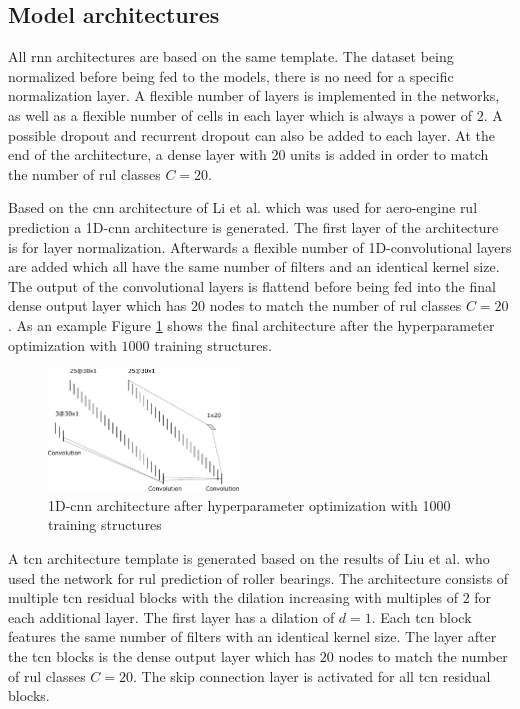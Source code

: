 \documentclass[conference]{IEEEtran}
\begin{document}
\subsection{Model architectures}
\label{sec:model_architectures}

All \gls{rnn} architectures are based on the same template. The dataset being normalized before being fed to the models, there is no need for a specific normalization layer. A flexible number of layers is implemented in the networks, as well as a flexible number of cells in each layer which is always a power of $ 2 $. A possible dropout and recurrent dropout can also be added to each layer. At the end of the architecture, a dense layer with $ 20 $ units is added in order to match the number of \gls{rul} classes $ C = 20 $.  

Based on the \gls{cnn} architecture of Li et al. \cite{Li2018} which was used for aero-engine \gls{rul} prediction a 1D-\gls{cnn} architecture is generated. The first layer of the architecture is for layer normalization. Afterwards a flexible number of 1D-convolutional layers are added which all have the same number of filters and an identical kernel size. The output of the convolutional layers is flattend before being fed into the final dense output layer which has $ 20 $ nodes to match the number of \gls{rul} classes $ C = 20 $. As an example Figure \ref{fig:cnn_architecture_1000_structures} shows the final architecture after the hyperparameter optimization with $ 1000 $ training structures.

\begin{figure}[htp]
	\centering
	\includegraphics[width=0.45\textwidth]{cnn_architecture_1000_structures.pdf}
	\caption{1D-\gls{cnn} architecture after hyperparameter optimization with 1000 training structures}
	\label{fig:cnn_architecture_1000_structures}
\end{figure}

A \gls{tcn} architecture template is generated based on the results of Liu et al. \cite{Liu2019} who used the network for \gls{rul} prediction of roller bearings. The architecture consists of multiple \gls{tcn} residual blocks with the dilation increasing with multiples of $ 2 $ for each additional layer. The first layer has a dilation of $ d = 1 $. Each \gls{tcn} block features the same number of filters with an identical kernel size. The layer after the \gls{tcn} blocks is the dense output layer which has $ 20 $ nodes to match the number of \gls{rul} classes $ C = 20 $. The skip connection layer is activated for all \gls{tcn} residual blocks.
\end{document}
